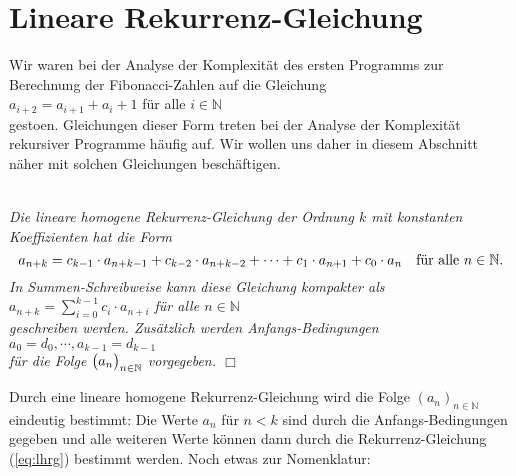 \section{Lineare Rekurrenz-Gleichung \label{sec:lineare-RG}}
Wir waren bei der Analyse der Komplexit\"at des ersten Programms zur Berechnung der
Fibonacci-Zahlen auf die Gleichung \\[0.1cm]
\hspace*{1.3cm} $a_{i+2} = a_{i+1} + {a_i} + 1$ \quad f\"ur alle $i \in \mathbb{N}$ \\[0.1cm]
gesto\3en. Gleichungen dieser Form treten bei der Analyse der Komplexit\"at rekursiver
Programme h\"aufig auf. Wir wollen uns daher in diesem Abschnitt n\"aher mit solchen
Gleichungen besch\"aftigen.

\begin{Definition} \hspace*{\fill} \\
{\em 
  Die \emph{lineare homogene Rekurrenz-Gleichung der Ordnung $k$ mit konstanten Koeffizienten} hat die Form
  \begin{equation}
    \label{eq:lhrg}
  a_{n+k} = c_{k-1} \cdot a_{n+k-1} + c_{k-2} \cdot a_{n+k-2} + \cdots + c_1 \cdot a_{n+1} + c_0 \cdot a_{n}
     \quad \mbox{f\"ur alle $n \in {\mathbb N}$}. 
  \end{equation}
     In Summen-Schreibweise kann diese Gleichung kompakter als 
     \\[0.1cm]
     \hspace*{1.3cm}
     $a_{n+k} = \sum\limits_{i=0}^{k-1} c_i \cdot a_{n+i}$ \quad f\"ur alle $n \in \mathbb{N}$
     \\[0.1cm]
     geschreiben werden.
     Zus\"atzlich werden \emph{Anfangs-Bedingungen}  
      \\[0.1cm]
      \hspace*{1.3cm}      
      $a_0 = d_0, \cdots, a_{k-1} = d_{k-1}$ 
      \\[0.1cm]
      f\"ur die Folge $\bigl(a_n\bigr)_{n\in\mathbb{N}}$ vorgegeben.    
    \hspace*{\fill} $\Box$
}
\end{Definition}
Durch eine lineare homogene Rekurrenz-Gleichung wird die Folge $(a_n)_{n\in\mathbb{N}}$
eindeutig bestimmt: Die Werte $a_n$ f\"ur $n < k$ sind durch die Anfangs-Bedingungen gegeben und
alle weiteren Werte k\"onnen dann durch die Rekurrenz-Gleichung (\ref{eq:lhrg}) bestimmt werden.
Noch  etwas zur Nomenklatur:
